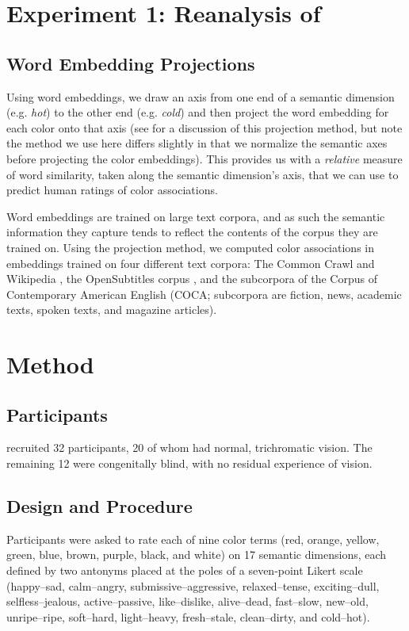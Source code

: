 \documentclass[10pt,letterpaper]{article}
\begin{document}
\section{Experiment 1: Reanalysis of }
\subsection{Word Embedding Projections}
Using word embeddings, we draw an axis from one end of a semantic dimension (e.g. \emph{hot}) to the other end (e.g. \emph{cold}) and then project the word embedding for each color onto that axis (see  for a discussion of this projection method, but note the method we use here differs slightly in that we normalize the semantic axes before projecting the color embeddings). This provides us with a \emph{relative} measure of word similarity, taken along the semantic dimension's axis, that we can use to predict human ratings of color associations.

Word embeddings are trained on large text corpora, and as such the semantic information they capture tends to reflect the contents of the corpus they are trained on. Using the projection method, we computed color associations in embeddings trained on four different text corpora: The Common Crawl and Wikipedia \cite{grave2018learning}, the OpenSubtitles corpus \cite{van2020subs2vec}, and the subcorpora of the Corpus of Contemporary American English (COCA; subcorpora are fiction, news, academic texts, spoken texts, and magazine articles).

\section{Method}

\subsection{Participants}
\citeauthor{saysani2021seeing} recruited 32 participants, 20 of whom had normal, trichromatic vision. The remaining 12 were congenitally blind, with no residual experience of vision.
\subsection{Design and Procedure}
Participants were asked to rate each of nine color terms (red, orange, yellow, green, blue, brown, purple, black, and white) on 17 semantic dimensions, each defined by two antonyms placed at the poles of a seven-point Likert scale (happy–sad, calm–angry, submissive–aggressive, relaxed–tense, exciting–dull, selfless–jealous, active–passive, like–dislike, alive–dead, fast–slow, new–old, unripe–ripe, soft–hard, light–heavy, fresh–stale, clean–dirty, and cold–hot).
\end{document}
